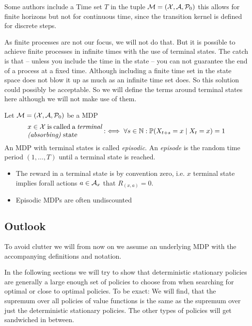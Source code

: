 Some authors include a Time set \(T\) in the tuple \(\mathcal{M}=(\mathcal{X},\mathcal{A},\mathcal{P}_0)\) \parencite[e.g.][]{putermanMarkovDecisionProcesses2005} this allows for finite horizons but not for continuous time, since the transition kernel is defined for discrete steps.


As finite processes are not our focus, we will not do that. But it is possible to achieve finite processes in infinite times with the use of terminal states. The catch is that -- unless you include the time in the state -- you can not guarantee the end of a process at a fixed time. Although including a finite time set in the state space does not blow it up as much as an infinite time set does. So this solution could possibly be acceptable. So we will define the terms around terminal states here although we will not make use of them.   

\begin{definition} Let \(\mathcal{M}=(\mathcal{X},\mathcal{A},\mathcal{P}_0)\) be a MDP
	\[
		\parbox{11em}{\(x\in\cX \) is called a \emph{terminal (absorbing)} state} :\iff \forall s\in\N: \Pr(X_{t+s}=x\mid X_t=x)=1
	\]
	An MDP with terminal states is called \emph{episodic}.
	An \emph{episode} is the random time period \((1,\dots,T)\) until a terminal state is reached.
\end{definition}
\begin{remark}\leavevmode{}
	\begin{itemize}
		\item The reward in a terminal state is by convention zero, i.e. \(x\) terminal state implies forall actions \(a\in\mathcal{A}_x\) that \(R_{(x,a)}=0\).
		\item Episodic MDPs are often undiscounted
	\end{itemize}	
\end{remark}

\subsection{Outlook}

To avoid clutter we will from now on we assume an underlying MDP with the accompanying definitions and notation.

In the following sections we will try to show that deterministic stationary policies are generally a large enough set of policies to choose from when searching for optimal or close to optimal policies. To be exact: We will find, that the supremum over all policies of value functions is the same as the supremum over just the deterministic stationary policies. The other types of policies will get sandwiched in between.

